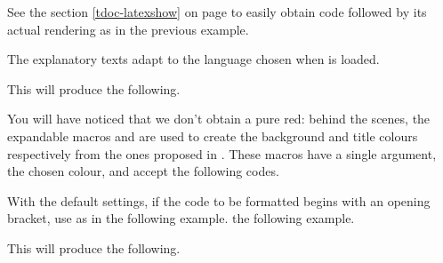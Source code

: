 \begin{tdocrem}
    See the section \ref{tdoc-latexshow} on page \pageref{tdoc-latexshow} to easily obtain code followed by its actual rendering as in the previous example.
\end{tdocrem}


\begin{tdocnote}
    The explanatory texts adapt to the language chosen when  is loaded.
\end{tdocnote}




\begin{tdocexa}
    \leavevmode


    This will produce the following.

    \medskip

    
\end{tdocexa}


\begin{tdocnote}
    You will have noticed that we don't obtain a pure red: behind the scenes, the expandable macros  and  are used to create the background and title colours respectively from the ones proposed in .
    These macros have a single argument, the chosen colour, and accept the following codes.

    \begin{tdoclatex}[code]
    \end{tdoclatex}
\end{tdocnote}




\begin{tdocwarn}
	With the default settings, if the code to be formatted begins with an opening bracket, use  as in the following example. the following example.


    This will produce the following.

    \medskip

    
\end{tdocwarn}


